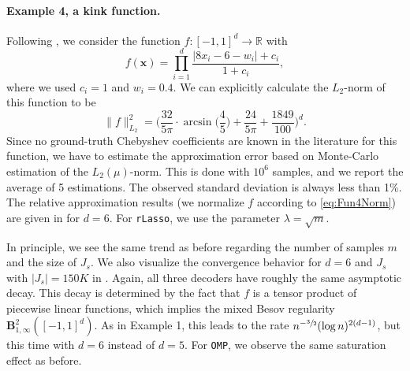 \documentclass[11pt,reqno, a4paper]{article}
\numberwithin{equation}{section}
\newcommand{\R}{\mathbb{R}}
\newcommand{\rlasso}{\texttt{rLasso}}
\newcommand{\omp}{\texttt{OMP}}
\newcommand{\cosamp}{\texttt{CoSaMP}}
\begin{document}
\begin{figure}[H]
\end{figure}

\paragraph{Example 4, a kink function.}
Following \cite{EggMinUll25}, we consider the function $f \colon [-1,1]^d \to \R$ with
\begin{equation}
    f(\mathbf{x}) = \prod_{i = 1}^d \frac{\vert 8 x_i -6 - w_i\vert + c_i}{1 + c_i},
\end{equation}
where we used \(c_i = 1\) and \(w_i = 0.4\). We can explicitly calculate the $L_2$-norm of this function to be
\begin{equation}\label{eq:Fun4Norm}
    \lVert f\rVert_{L_2}^2 = \biggl(\frac{32}{5\pi}\cdot\arcsin\biggl(\frac{4}{5}\biggr) + \frac{24}{5\pi} + \frac{1849}{100}\biggr)^d.
\end{equation}
Since no ground-truth Chebyshev coefficients are known in the literature for this function, we have to estimate the approximation error based on Monte-Carlo estimation of the $L_2(\mu)$-norm.
This is done with $10^6$ samples, and we report the average of 5 estimations.
The observed standard deviation is always less than 1\%.
The relative approximation results (we normalize $f$ according to \eqref{eq:Fun4Norm}) are given in  for $d=6$.
For \rlasso, we use the parameter $\lambda = \sqrt{m}$.


In principle, we see the same trend as before regarding the number of samples $m$ and the size of $J_s$.
We also visualize the convergence behavior for $d=6$ and $J_s$ with $\vert J_s \vert = 150K$ in .
Again, all three decoders have roughly the same asymptotic decay.
This decay is determined by the fact that $f$ is a tensor product of piecewise linear functions, which implies the mixed Besov regularity $\mathbf{B}^2_{1,\infty}([-1,1]^d)$.
As in Example 1, this leads to the rate $n^{-\sfrac{3}{2}}(\log n)^{2(d-1)}$, but this time with $d=6$ instead of $d=5$.
For \omp, we observe the same saturation effect as before.
\end{document}

